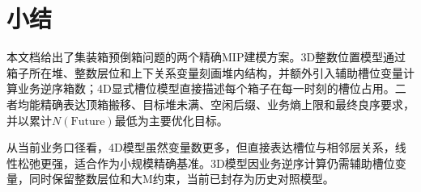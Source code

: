 \documentclass[11pt,a4paper]{ctexart}
\begin{document}
\section{小结}

本文档给出了集装箱预倒箱问题的两个精确MIP建模方案。3D整数位置模型通过箱子所在堆、整数层位和上下关系变量刻画堆内结构，并额外引入辅助槽位变量计算业务逆序箱数；4D显式槽位模型直接描述每个箱子在每一时刻的槽位占用。二者均能精确表达顶箱搬移、目标堆未满、空闲后缀、业务熵上限和最终良序要求，并以累计$N(\mathrm{Future})$最低为主要优化目标。

从当前业务口径看，4D模型虽然变量数更多，但直接表达槽位与相邻层关系，线性松弛更强，适合作为小规模精确基准。3D模型因业务逆序计算仍需辅助槽位变量，同时保留整数层位和大M约束，当前已封存为历史对照模型。
\end{document}
